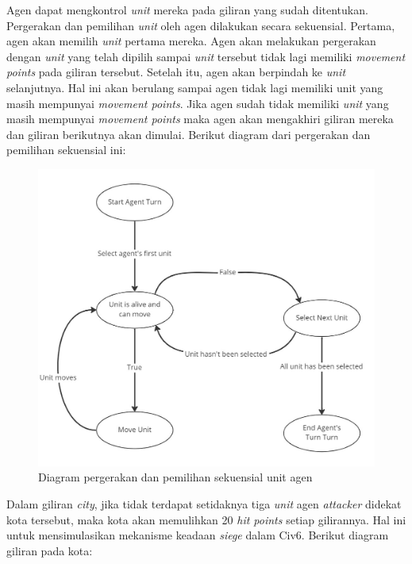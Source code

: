 Agen dapat mengkontrol \emph{unit} mereka pada giliran yang sudah ditentukan.
Pergerakan dan pemilihan \emph{unit} oleh agen dilakukan secara sekuensial. Pertama, agen akan memilih \emph{unit} pertama mereka.
Agen akan melakukan pergerakan dengan \emph{unit} yang telah dipilih sampai \emph{unit} tersebut tidak lagi memiliki \emph{movement points}
pada giliran tersebut.
Setelah itu, agen akan berpindah ke \emph{unit} selanjutnya. Hal ini akan berulang sampai agen tidak lagi memiliki unit yang masih
mempunyai \emph{movement points}. Jika agen sudah tidak memiliki \emph{unit} yang masih mempunyai \emph{movement points}
maka agen akan mengakhiri giliran mereka dan giliran berikutnya akan dimulai.
Berikut diagram dari pergerakan dan pemilihan sekuensial ini:

\begin{figure}[H]
  \centering
    \includegraphics[scale=0.33]{gambar/unit_sequential_movement.jpg}
    \caption{Diagram pergerakan dan pemilihan sekuensial unit agen}
    \label{fig:sequentialMovementDiagram}
\end{figure}

Dalam giliran \emph{city}, jika tidak terdapat setidaknya tiga \emph{unit} agen \emph{attacker} didekat kota tersebut,
maka kota akan memulihkan 20 \emph{hit points} setiap gilirannya. Hal ini untuk mensimulasikan mekanisme keadaan \emph{siege}
dalam Civ6. Berikut diagram giliran pada kota:

